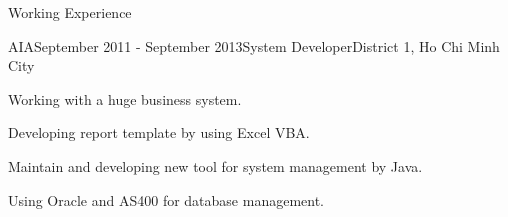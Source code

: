\documentclass{resume} %
\begin{document}
\begin{rSection}{Working Experience}

\begin{rSubsection}{AIA}{September 2011 - September 2013}{System Developer}{District 1, Ho Chi Minh City}
\item Working with a huge business system.
\item Developing report template by using Excel VBA.
\item Maintain and developing new tool for system management by Java.
\item Using Oracle and AS400 for database management.
\end{rSubsection}

\end{rSection}







\end{document}
